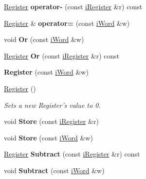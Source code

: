 \begin{DoxyCompactItemize}
\item 
\hypertarget{classRegister_a43c957e4b6a3103f0634258891c82b46}{
\hyperlink{classRegister}{Register} {\bfseries operator-\/} (const \hyperlink{classiRegister}{iRegister} \&r) const }
\label{classRegister_a43c957e4b6a3103f0634258891c82b46}

\item 
\hypertarget{classRegister_afc5f775405700146638e392d81ad7d0b}{
\hyperlink{classRegister}{Register} \& {\bfseries operator=} (const \hyperlink{classiWord}{iWord} \&w)}
\label{classRegister_afc5f775405700146638e392d81ad7d0b}

\item 
\hypertarget{classRegister_ab2f8407fab157d8deea936fa74424115}{
void {\bfseries Or} (const \hyperlink{classiWord}{iWord} \&w)}
\label{classRegister_ab2f8407fab157d8deea936fa74424115}

\item 
\hypertarget{classRegister_a9400801cc625144c4606cd7f5cbbaa21}{
\hyperlink{classRegister}{Register} {\bfseries Or} (const \hyperlink{classiRegister}{iRegister} \&r) const }
\label{classRegister_a9400801cc625144c4606cd7f5cbbaa21}

\item 
\hypertarget{classRegister_a1a18c39fc5cbc479c0f32fb9e0172376}{
{\bfseries Register} (const \hyperlink{classiWord}{iWord} \&w)}
\label{classRegister_a1a18c39fc5cbc479c0f32fb9e0172376}

\item 
\hypertarget{classRegister_a669b96861697fb8c04bce79f04390c66}{
\hyperlink{classRegister_a669b96861697fb8c04bce79f04390c66}{Register} ()}
\label{classRegister_a669b96861697fb8c04bce79f04390c66}

\begin{DoxyCompactList}\small\item\em Sets a new Register's value to 0. \item\end{DoxyCompactList}\item 
\hypertarget{classRegister_a2ac7bd6f2e0eb38800c0a8c8d045e18e}{
void {\bfseries Store} (const \hyperlink{classiRegister}{iRegister} \&r)}
\label{classRegister_a2ac7bd6f2e0eb38800c0a8c8d045e18e}

\item 
\hypertarget{classRegister_affcc16cc88cdc896803b1ab6af5d38e0}{
void {\bfseries Store} (const \hyperlink{classiWord}{iWord} \&w)}
\label{classRegister_affcc16cc88cdc896803b1ab6af5d38e0}

\item 
\hypertarget{classRegister_a05132a4a62f5c6883fdf78731970ab6a}{
\hyperlink{classRegister}{Register} {\bfseries Subtract} (const \hyperlink{classiRegister}{iRegister} \&r) const }
\label{classRegister_a05132a4a62f5c6883fdf78731970ab6a}

\item 
\hypertarget{classRegister_a726a720b6bcca282945f1c0a65ca0dd4}{
void {\bfseries Subtract} (const \hyperlink{classiWord}{iWord} \&w)}
\label{classRegister_a726a720b6bcca282945f1c0a65ca0dd4}

\end{DoxyCompactItemize}
